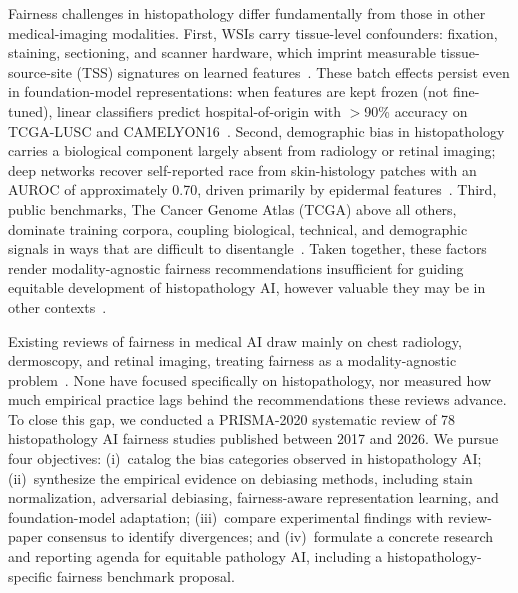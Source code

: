 Fairness challenges in histopathology differ fundamentally from those in other medical-imaging modalities. First, WSIs carry tissue-level confounders: fixation, staining, sectioning, and scanner hardware, which imprint measurable tissue-source-site (TSS) signatures on learned features~\citep{howard2021site, kheiri2025investigation, bidgoli2022bias}. These batch effects persist even in foundation-model representations: when features are kept frozen (not fine-tuned), linear classifiers predict hospital-of-origin with $>$90\% accuracy on TCGA-LUSC and CAMELYON16~\citep{komen2024batch}. Second, demographic bias in histopathology carries a biological component largely absent from radiology or retinal imaging; deep networks recover self-reported race from skin-histology patches with an AUROC of approximately 0.70, driven primarily by epidermal features~\citep{chen2025predicting}. Third, public benchmarks, The Cancer Genome Atlas (TCGA) above all others, dominate training corpora, coupling biological, technical, and demographic signals in ways that are difficult to disentangle~\citep{howard2021site, tasci2022bias, montezuma2025unbiased}. Taken together, these factors render modality-agnostic fairness recommendations insufficient for guiding equitable development of histopathology AI, however valuable they may be in other contexts~\citep{riccilara2022addressing, chen2023algorithmic, yang2024survey, chinta2025aidriven, musa2026cross}.

Existing reviews of fairness in medical AI draw mainly on chest radiology, dermoscopy, and retinal imaging, treating fairness as a modality-agnostic problem~\citep{riccilara2022addressing, chen2023algorithmic, celi2022sources, yang2024survey}. None have focused specifically on histopathology, nor measured how much empirical practice lags behind the recommendations these reviews advance. To close this gap, we conducted a PRISMA-2020 systematic review of 78 histopathology AI fairness studies published between 2017 and 2026. We pursue four objectives: (i)~catalog the bias categories observed in histopathology AI; (ii)~synthesize the empirical evidence on debiasing methods, including stain normalization, adversarial debiasing, fairness-aware representation learning, and foundation-model adaptation; (iii)~compare experimental findings with review-paper consensus to identify divergences; and (iv)~formulate a concrete research and reporting agenda for equitable pathology AI, including a histopathology-specific fairness benchmark proposal.

